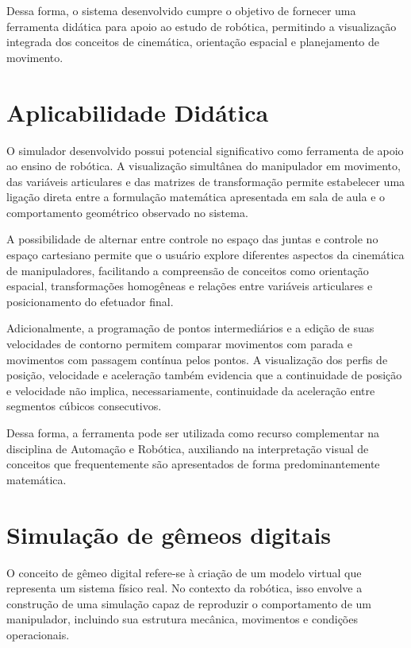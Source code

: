 Dessa forma, o sistema desenvolvido cumpre o objetivo de fornecer uma ferramenta didática para apoio ao estudo de robótica, permitindo a visualização integrada dos conceitos de cinemática, orientação espacial e planejamento de movimento.

\section{Aplicabilidade Didática}

O simulador desenvolvido possui potencial significativo como ferramenta de apoio ao ensino de robótica. A visualização simultânea do manipulador em movimento, das variáveis articulares e das matrizes de transformação permite estabelecer uma ligação direta entre a formulação matemática apresentada em sala de aula e o comportamento geométrico observado no sistema.

A possibilidade de alternar entre controle no espaço das juntas e controle no espaço cartesiano permite que o usuário explore diferentes aspectos da cinemática de manipuladores, facilitando a compreensão de conceitos como orientação espacial, transformações homogêneas e relações entre variáveis articulares e posicionamento do efetuador final.

Adicionalmente, a programação de pontos intermediários e a edição de suas velocidades de contorno permitem comparar movimentos com parada e movimentos com passagem contínua pelos pontos. A visualização dos perfis de posição, velocidade e aceleração também evidencia que a continuidade de posição e velocidade não implica, necessariamente, continuidade da aceleração entre segmentos cúbicos consecutivos.

Dessa forma, a ferramenta pode ser utilizada como recurso complementar na disciplina de Automação e Robótica, auxiliando na interpretação visual de conceitos que frequentemente são apresentados de forma predominantemente matemática.

\section{Simulação de gêmeos digitais}

O conceito de gêmeo digital refere-se à criação de um modelo virtual que representa um sistema físico real. No contexto da robótica, isso envolve a construção de uma simulação capaz de reproduzir o comportamento de um manipulador, incluindo sua estrutura mecânica, movimentos e condições operacionais.

